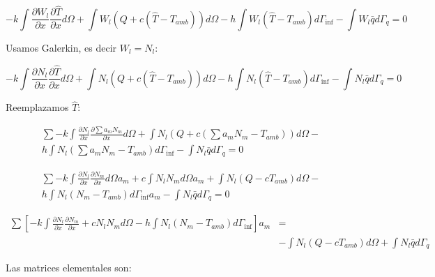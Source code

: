 \documentclass{article}
\begin{document}
\begin{enumerate}[1)]
{        \begin{equation*}
            - k\int{ \frac{\partial W_l}{\partial x} \frac{\partial \hat{T}}{\partial x} d\Omega} + \int{W_l \left( Q + c\left(\hat{T}-T_{amb}\right) \right) d\Omega} - h \int{ W_l \left(\hat{T}-T_{amb}\right) d\Gamma_{\inf}} - \int{ W_l \bar{q} d\Gamma_{q}} = 0
        \end{equation*}

        Usamos Galerkin, es decir $W_l = N_l$:

        \begin{equation*}
            - k\int{ \frac{\partial N_l}{\partial x} \frac{\partial \hat{T}}{\partial x} d\Omega} + \int{N_l \left( Q + c\left(\hat{T}-T_{amb}\right) \right) d\Omega} - h \int{ N_l \left(\hat{T}-T_{amb}\right) d\Gamma_{\inf}} - \int{ N_l \bar{q} d\Gamma_{q}} = 0
        \end{equation*}

        Reemplazamos $\hat{T}$:

        \begin{align*}
            \sum{ - k\int{ \frac{\partial N_l}{\partial x} \frac{\partial \sum{a_m N_m}}{\partial x} d\Omega} + \int{N_l \left( Q + c\left(\sum{a_m N_m}-T_{amb}\right) \right) d\Omega} - }\\
            h \int{ N_l \left(\sum{a_m N_m}-T_{amb}\right) d\Gamma_{\inf}} - \int{ N_l \bar{q} d\Gamma_{q}} = 0
        \end{align*}

        \begin{align*}
            \sum{ - k\int{ \frac{\partial N_l}{\partial x} \frac{\partial N_m}{\partial x} d\Omega} a_m + c\int{N_l N_m d\Omega} a_m + \int{N_l \left( Q - cT_{amb}\right) d\Omega} - }\\ 
            h \int{ N_l \left(N_m-T_{amb}\right) d\Gamma_{\inf}} a_m - \int{ N_l \bar{q} d\Gamma_{q}} = 0
        \end{align*}

        \begin{align*}
            \sum{ \left[ - k\int{ \frac{\partial N_l}{\partial x} \frac{\partial N_m}{\partial x} + c N_l N_m  d\Omega} - h \int{ N_l \left(N_m-T_{amb}\right) d\Gamma_{\inf}} \right] a_m }  &=\\
            &-\int{N_l \left( Q - cT_{amb}\right) d\Omega} + \int{ N_l \bar{q} d\Gamma_{q}}
        \end{align*}

        Las matrices elementales son:

}
\end{enumerate}
\end{document}
